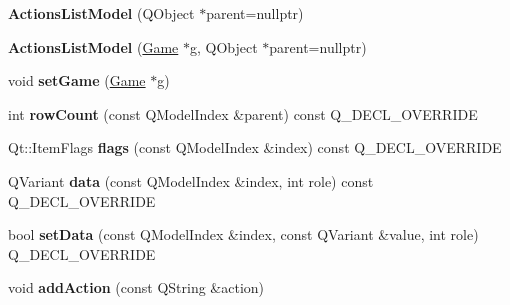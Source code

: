 \begin{DoxyCompactItemize}
\item 
\hypertarget{class_actions_list_model_a1f893e83c359d862d75cd00a2ed01df3}{{\bfseries \-Actions\-List\-Model} (\-Q\-Object $\ast$parent=nullptr)}\label{class_actions_list_model_a1f893e83c359d862d75cd00a2ed01df3}

\item 
\hypertarget{class_actions_list_model_a48eb4200a7f2890111cff8d8376c9cb2}{{\bfseries \-Actions\-List\-Model} (\hyperlink{class_game}{\-Game} $\ast$g, \-Q\-Object $\ast$parent=nullptr)}\label{class_actions_list_model_a48eb4200a7f2890111cff8d8376c9cb2}

\item 
\hypertarget{class_actions_list_model_ae90d0e98302804f8ecc40bb65b22131d}{void {\bfseries set\-Game} (\hyperlink{class_game}{\-Game} $\ast$g)}\label{class_actions_list_model_ae90d0e98302804f8ecc40bb65b22131d}

\item 
\hypertarget{class_actions_list_model_aecfb775e2ecf4b3bdccfbb96795fc188}{int {\bfseries row\-Count} (const \-Q\-Model\-Index \&parent) const \-Q\-\_\-\-D\-E\-C\-L\-\_\-\-O\-V\-E\-R\-R\-I\-D\-E}\label{class_actions_list_model_aecfb775e2ecf4b3bdccfbb96795fc188}

\item 
\hypertarget{class_actions_list_model_ae1f16b74cfd3675985ce60c8935c026c}{\-Qt\-::\-Item\-Flags {\bfseries flags} (const \-Q\-Model\-Index \&index) const \-Q\-\_\-\-D\-E\-C\-L\-\_\-\-O\-V\-E\-R\-R\-I\-D\-E}\label{class_actions_list_model_ae1f16b74cfd3675985ce60c8935c026c}

\item 
\hypertarget{class_actions_list_model_a13e347c18139aa472fe6cf298ea123da}{\-Q\-Variant {\bfseries data} (const \-Q\-Model\-Index \&index, int role) const \-Q\-\_\-\-D\-E\-C\-L\-\_\-\-O\-V\-E\-R\-R\-I\-D\-E}\label{class_actions_list_model_a13e347c18139aa472fe6cf298ea123da}

\item 
\hypertarget{class_actions_list_model_a993625971d9ebff43d9dbb0b786b35cb}{bool {\bfseries set\-Data} (const \-Q\-Model\-Index \&index, const \-Q\-Variant \&value, int role) \-Q\-\_\-\-D\-E\-C\-L\-\_\-\-O\-V\-E\-R\-R\-I\-D\-E}\label{class_actions_list_model_a993625971d9ebff43d9dbb0b786b35cb}

\item 
\hypertarget{class_actions_list_model_ae2e8cd005fb6cd17f71596339981598e}{void {\bfseries add\-Action} (const \-Q\-String \&action)}\label{class_actions_list_model_ae2e8cd005fb6cd17f71596339981598e}

\end{DoxyCompactItemize}


